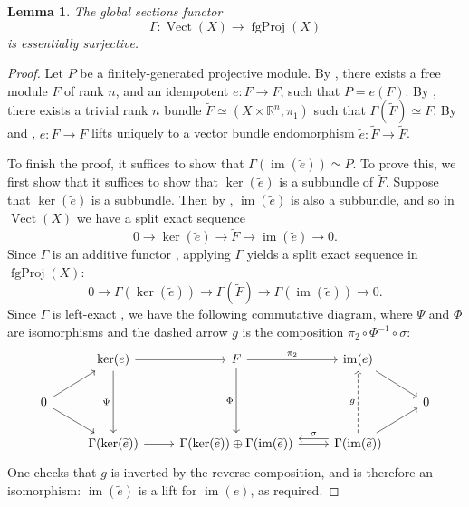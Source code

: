 \documentclass[11pt]{article}
\newcommand{\R}{\mathbb{R}}
\newcommand{\Vect}{\operatorname{Vect}}
\newcommand{\fgProj}{\operatorname{fgProj}}
\newcommand{\im}{\operatorname{im}}
\renewcommand{\ker}{\operatorname{ker}}
\theoremstyle{plain}
\newtheorem{lemma}{Lemma}[section]
\theoremstyle{definition}
\begin{document}
\begin{lemma}\label{lemma:global-sections-essentially-surjective}
  The global sections functor
  \[\Gamma : \Vect(X) \longrightarrow \fgProj(X)\]
  is essentially surjective.
\end{lemma}
\begin{proof}
  Let \(P\) be a finitely-generated projective module. By , there exists a free module \(F\) of rank \(n\), and an idempotent \(e : F \to F\), such that \(P = e(F)\). By , there exists a trivial rank \(n\) bundle \(\widetilde{F} \simeq (X \times \R^n, \pi_1)\) such that \(\Gamma(\widetilde{F}) \simeq F\). By  and , \(e : F \to F\) lifts uniquely to a vector bundle endomorphism \(\widetilde{e} : \widetilde{F} \to \widetilde{F}\).

  To finish the proof, it suffices to show that \(\Gamma(\im(\widetilde{e})) \simeq P\). To prove this, we first show that it suffices to show that \(\ker(\widetilde{e})\) is a subbundle of \(\widetilde{F}\). Suppose that \(\ker(\widetilde{e})\) is a subbundle. Then by , \(\im(\widetilde{e})\) is also a subbundle, and so in \(\Vect(X)\) we have a split exact sequence
  \[
0 \to \ker(\widetilde{e}) \to \widetilde{F} \to \im(\widetilde{e}) \to 0.
  \]
  Since \(\Gamma\) is an additive functor , applying \(\Gamma\) yields a split exact sequence in \(\fgProj(X)\):
  \[
0 \to \Gamma(\ker(\widetilde{e})) \to \Gamma(\widetilde{F}) \to \Gamma(\im(\widetilde{e})) \to 0.
\]
Since \(\Gamma\) is left-exact , we have the following commutative diagram, where \(\Psi\) and \(\Phi\) are isomorphisms and the dashed arrow \(g\) is the composition \(\pi_2 \circ \Phi^{-1} \circ \sigma\):
\[
  \begin{tikzcd}
    & \ker(e) \arrow[swap]{dd}{\Psi} \arrow{r}& F \arrow[swap]{dd}{\Phi} \arrow{r}{\pi_2} & \im(e) \arrow{rd}& \\
  0 \arrow{ur} \arrow{dr}  & & & & 0\\
    & \Gamma(\ker(\widetilde{e})) \arrow{r}& \Gamma(\ker(\widetilde{e})) \oplus \Gamma(\im(\widetilde{e})) \arrow{r} & \Gamma(\im(\widetilde{e})) \arrow[swap, shift right = 1ex]{l}{\sigma} \arrow[dashed]{uu}{g} \arrow{ru} & 
  \end{tikzcd}
\]
One checks that \(g\) is inverted by the reverse composition, and is therefore an isomorphism: \(\im(\widetilde{e})\) is a lift for \(\im(e)\), as required.


\end{proof}
\end{document}
